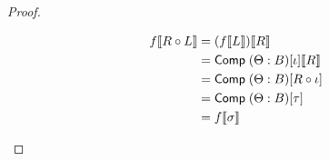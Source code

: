 \documentclass[draft]{article}
\newcommand*{\Comp}[3]{\ensuremath\mathsf{Comp}\;(#1:#2)[#3]}
\newcommand*{\sub}[2]{\ensuremath{#1\llbracket #2 \rrbracket}}
\begin{document}
\begin{proof}
\begin{enumerate}
    \begin{align*}
      \sub f {R \circ L} &= \sub {(\sub f L)} R\\
                         &= \sub {\Comp \Theta B \iota} R\\
                         &= \Comp \Theta B {R \circ \iota}\\
                         &= \Comp \Theta B \tau\\
                         &= \sub f \sigma
    \end{align*}
  \end{enumerate}
\end{proof}
\end{document}

